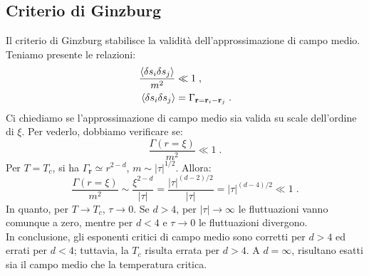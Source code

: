 \documentclass[10pt,a4paper]{report}
\theoremstyle{definition}
\numberwithin{equation}{section}
\newcommand{\bra}{\langle}
\newcommand{\ket}{\rangle}
\begin{document}
\subsection{Criterio di Ginzburg}
Il criterio di Ginzburg stabilisce la validità dell'approssimazione di campo medio. Teniamo presente le relazioni:
\begin{align}
\frac{\bra\delta s_i\delta s_j\ket}{m^2}&\ll 1 \notag\;, \\
\bra\delta s_i\delta s_j\ket &= \Gamma_{\mathbf{r}=\mathbf{r}_i-\mathbf{r}_j}\;.
\end{align}
Ci chiediamo se l'approssimazione di campo medio sia valida su scale dell'ordine di $\xi$. Per vederlo, dobbiamo verificare se:
\begin{equation}
\frac{\Gamma(r=\xi)}{m^2}\ll 1\;.
\end{equation}
Per $T=T_c$, si ha $\Gamma_{\mathbf{r}}\simeq r^{2-d}$, $m\sim |\tau|^{1/2}$. Allora:
\begin{equation}
\frac{\Gamma(r=\xi)}{m^2}\sim \frac{\xi^{2-d}}{|\tau|}=\frac{|\tau|^{(d-2)/2}}{|\tau|}=|\tau|^{(d-4)/2}\ll 1\;.
\end{equation}
In quanto, per $T\to T_c$, $\tau\to 0$. Se $d>4$, per $|\tau|\to \infty$ le fluttuazioni vanno comunque a zero, mentre per $d<4$ e $\tau\to 0$ le fluttuazioni divergono. \\
In conclusione, gli esponenti critici di campo medio sono corretti per $d>4$ ed errati per $d<4$; tuttavia, la $T_c$ risulta errata per $d>4$. A $d=\infty$, risultano esatti sia il campo medio che la temperatura critica.
\end{document}
